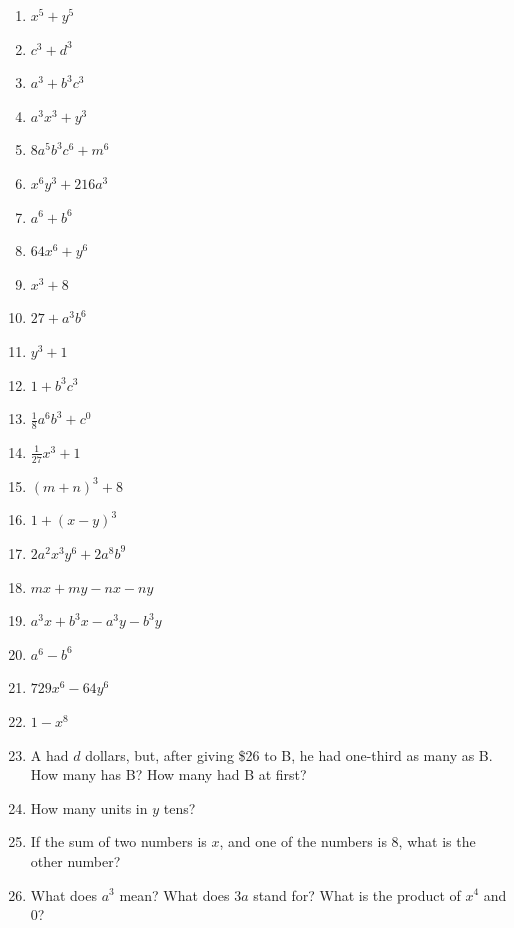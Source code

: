 \documentclass{book}
\begin{document}
\begin{enumerate}
\item $x^5 + y^5$

\item $c^3 + d^3$

\item $a^3 + b^3c^3$

\item $a^3x^3 + y^3$

\item $8a^5b^3c^6 + m^6$

\item $x^6y^3 + 216a^3$

\item $a^6 + b^6$

\item $64x^6 + y^6$

\item $x^3 + 8$

\item $27 + a^3b^6$

\item $y^3 + 1$

\item $1 + b^3c^3$

\item $\frac{1}{8}a^6b^3+ c^0$

\item $\frac{1}{27}x^3+ 1$

\item $(m + n)^3+ 8$

\item $1 + (x - y)^3$

\item $2a^2x^3y^6 + 2a^8b^9$

\item $mx + my - nx - ny$

\item $a^3x + b^3x - a^3y - b^3y$

\item $a^6 - b^6$

\item $729x^6 - 64y^6$

\item $1 - x^8$

\item A had $d$ dollars, but, after giving \$26 to B, he had
one-third as many as B. How many has B? How many had B at first?

\item How many units in $y$ tens?

\item If the sum of two numbers is $x$, and one of the numbers is
8, what is the other number?

\item What does $a^3$ mean? What does $3a$ stand for? What is the
product of $x^4$ and $0$?
\end{enumerate}
\end{document}

